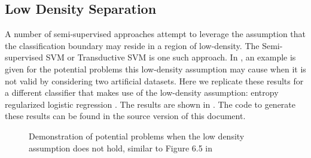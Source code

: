 \documentclass[runningheads,a4paper]{llncs}\usepackage[]{graphicx}\usepackage[]{color}
\newenvironment{knitrout}{}{} %
\begin{document}
\subsection{Low Density Separation}
A number of semi-supervised approaches attempt to leverage the assumption that the classification boundary may reside in a region of low-density. The Semi-supervised SVM or Transductive SVM \cite{Joachims1999} is one such approach. In \cite[Chapter 6]{Zhu2009}, an example is given for the potential problems this low-density assumption may cause when it is not valid by considering two artificial datasets. Here we replicate these results for a different classifier that makes use of the low-density assumption: entropy regularized logistic regression \cite{Grandvalet2005}. The results are shown in . The code to generate these results can be found in the source version of this document.
\begin{knitrout}\footnotesize
{}\color{fgcolor}\begin{figure}
\caption[Demonstration of potential problems when the low density assumption does not hold, similar to Figure 6.5 in \cite{Zhu2009}]{Demonstration of potential problems when the low density assumption does not hold, similar to Figure 6.5 in \cite{Zhu2009}}\label{fig:lowdensityproblem}
\end{figure}


\end{knitrout}
\end{document}
